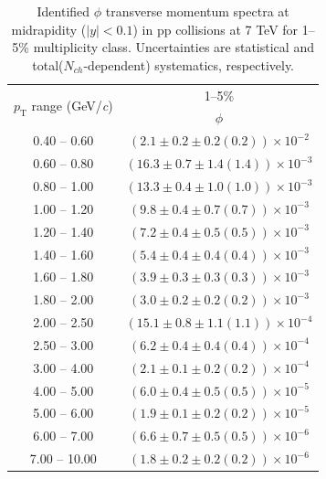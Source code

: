 \begin{table}
\caption{Identified $\phi$ transverse momentum spectra at midrapidity ($|y|<0.1$) in pp collisions at 7 TeV for 1--5\% multiplicity class. Uncertainties are statistical and total($N_{ch}$-dependent) systematics, respectively.}
\label{tab:Phi_1to5}
\begin{center}
\begin{tabular}{ c | c }
\hline
\multirow{2}{*}{$p_{\mathrm{T}}$ range (GeV/\textit{c})} & \multicolumn{1}{c}{1--5\%} \\ & $\phi$\\ 
\hline
0.40 -- 0.60 & $(2.1\pm0.2\pm0.2(0.2))\times10^{-2}$ \\ 
0.60 -- 0.80 & $(16.3\pm0.7\pm1.4(1.4))\times10^{-3}$ \\ 
0.80 -- 1.00 & $(13.3\pm0.4\pm1.0(1.0))\times10^{-3}$ \\ 
1.00 -- 1.20 & $(9.8\pm0.4\pm0.7(0.7))\times10^{-3}$ \\ 
1.20 -- 1.40 & $(7.2\pm0.4\pm0.5(0.5))\times10^{-3}$ \\ 
1.40 -- 1.60 & $(5.4\pm0.4\pm0.4(0.4))\times10^{-3}$ \\ 
1.60 -- 1.80 & $(3.9\pm0.3\pm0.3(0.3))\times10^{-3}$ \\ 
1.80 -- 2.00 & $(3.0\pm0.2\pm0.2(0.2))\times10^{-3}$ \\ 
2.00 -- 2.50 & $(15.1\pm0.8\pm1.1(1.1))\times10^{-4}$ \\ 
2.50 -- 3.00 & $(6.2\pm0.4\pm0.4(0.4))\times10^{-4}$ \\ 
3.00 -- 4.00 & $(2.1\pm0.1\pm0.2(0.2))\times10^{-4}$ \\ 
4.00 -- 5.00 & $(6.0\pm0.4\pm0.5(0.5))\times10^{-5}$ \\ 
5.00 -- 6.00 & $(1.9\pm0.1\pm0.2(0.2))\times10^{-5}$ \\ 
6.00 -- 7.00 & $(6.6\pm0.7\pm0.5(0.5))\times10^{-6}$ \\ 
7.00 -- 10.00 & $(1.8\pm0.2\pm0.2(0.2))\times10^{-6}$ \\ 
\hline
\end{tabular}
\end{center}
\end{table}
 
